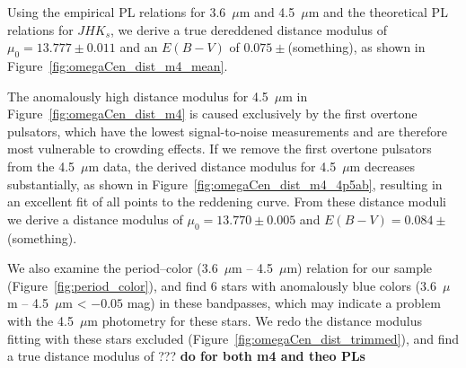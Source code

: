 \documentclass[a4paper,fleqn,usenatbib]{mnras}
\begin{document}



Using the empirical PL relations for 3.6~$\mu$m and 4.5~$\mu$m and the theoretical PL relations for $J\!H\!K_s$, we derive a true dereddened distance modulus of $\mu_0 = 13.777 \pm 0.011$ and an $E(B-V)$ of $0.075 \pm $(something), as shown in Figure~\ref{fig:omegaCen_dist_m4_mean}.

The anomalously high distance modulus for 4.5~$\mu$m in Figure~\ref{fig:omegaCen_dist_m4} is caused exclusively by the first overtone pulsators, which have the lowest signal-to-noise measurements and are therefore most vulnerable to crowding effects. If we remove the first overtone pulsators from the 4.5~$\mu$m data, the derived distance modulus for 4.5~$\mu$m decreases substantially, as shown in Figure~\ref{fig:omegaCen_dist_m4_4p5ab}, resulting in an excellent fit of all points to the reddening curve. From these distance moduli we derive a distance modulus of $\mu_0 = 13.770 \pm 0.005$ and $E(B-V) = 0.084 \pm$(something).

We also examine the period--color (3.6~$\mu$m -- 4.5~$\mu$m) relation for our sample (Figure~\ref{fig:period_color}), and find 6 stars with anomalously blue colors (3.6~$\mu$m -- 4.5~$\mu$m < $-0.05$ mag) in these bandpasses, which may indicate a problem with the 4.5~$\mu$m photometry for these stars. We redo the distance modulus fitting with these stars excluded (Figure~\ref{fig:omegaCen_dist_trimmed}), and find a true distance modulus of ??? {\bf do for both m4 and theo PLs}
\end{document}
